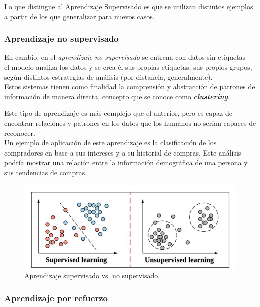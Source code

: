 Lo que distingue al Aprendizaje Supervisado es que se utilizan distintos ejemplos a partir de los que generalizar para nuevos casos. 

\subsubsection{Aprendizaje no supervisado}

En cambio, en el \textit{aprendizaje no supervisado} se entrena con datos sin etiquetas - el modelo analiza los datos y se crea él sus propias etiquetas, sus propios grupos, según distintos estrategias de análisis (por distancia, generalmente). \\

Estos sistemas tienen como finalidad la comprensión y abstracción de patrones de información de manera directa, concepto que se conoce como \textbf{\textit{clustering}}.

Este tipo de aprendizaje es más complejo que el anterior, pero es capaz de encontrar relaciones y patrones en los datos que los humanos no serían capaces de reconocer. \\

Un ejemplo de aplicación de este aprendizaje es la clasificación de los compradores en base a sus intereses y a su historial de compras. Este análisis podría mostrar una relación entre la información demográfica de una persona y sus tendencias de compras. \\

\begin{figure}[h]
    \centering
    \includegraphics[scale=1]{cap2_contextualizacion/images/diff_sup_unsu.jpg}
    \caption{Aprendizaje supervisado vs. no supervisado.}
    \label{fig:diff_sup_unsu}
\end{figure}

\subsubsection{Aprendizaje por refuerzo}

